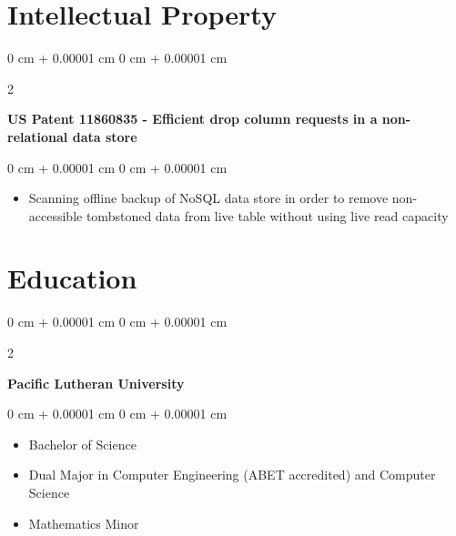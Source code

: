 \documentclass[10pt, letterpaper]{article}
\newenvironment{highlights}{
    \begin{itemize}[
        topsep=0.10 cm,
        parsep=0.10 cm,
        partopsep=0pt,
        itemsep=0pt,
        leftmargin=0 cm + 10pt
    ]
}{
    \end{itemize}
} %
\newenvironment{onecolentry}{
    \begin{adjustwidth}{
        0 cm + 0.00001 cm
    }{
        0 cm + 0.00001 cm
    }
}{
    \end{adjustwidth}
} %
\newenvironment{twocolentry}[2][]{
    \onecolentry
    \def\secondColumn{#2}
    \setcolumnwidth{\fill, 4.5 cm}
    \begin{paracol}{2}
}{
    \switchcolumn \raggedleft \secondColumn
    \end{paracol}
    \endonecolentry
} %
\begin{document}
    
    \section{Intellectual Property}

        \begin{samepage}
            \begin{twocolentry}{
            
            }
                \textbf{US Patent 11860835 - Efficient drop column requests in a non-relational data store}
            \end{twocolentry}

            \vspace{0.10 cm}
            
            \begin{onecolentry}
                \begin{highlights}
                    \item Scanning offline backup of NoSQL data store in order to remove non-accessible tombstoned data from live table without using live read capacity
                \end{highlights}
            \end{onecolentry}
        \end{samepage}

    
    \section{Education}

        \begin{twocolentry}{
            
        }
            \textbf{Pacific Lutheran University}
        \end{twocolentry}

        \vspace{0.10 cm}
        \begin{onecolentry}
            \begin{highlights}
                \item Bachelor of Science
                \item Dual Major in Computer Engineering (ABET accredited) and Computer Science
                \item Mathematics Minor
            \end{highlights}
        \end{onecolentry}
\end{document}
